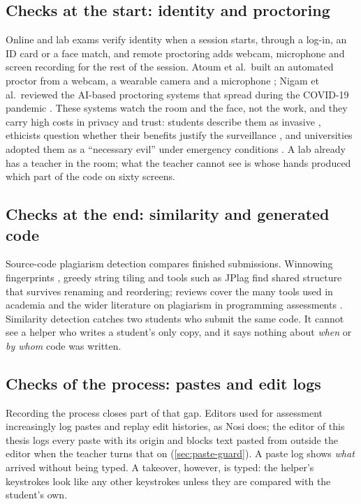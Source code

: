 \subsection{Checks at the start: identity and proctoring}
Online and lab exams verify identity when a session starts, through a
log-in, an ID card or a face match, and remote proctoring adds webcam,
microphone and screen recording for the rest of the session. Atoum et al.\
built an automated proctor from a webcam, a wearable camera and a microphone
\cite{atoum2017proctoring}; Nigam et al.\ reviewed the AI-based proctoring
systems that spread during the COVID-19 pandemic \cite{nigam2021proctoring}.
These systems watch the room and the face, not the work, and they carry high
costs in privacy and trust: students describe them as invasive
\cite{balash2021examining}, ethicists question whether their benefits justify
the surveillance \cite{coghlan2021proctor}, and universities adopted them as
a ``necessary evil'' under emergency conditions \cite{selwyn2023necessary}.
A lab already has a teacher in the room; what the teacher cannot see is whose
hands produced which part of the code on sixty screens.

\subsection{Checks at the end: similarity and generated code}
Source-code plagiarism detection compares finished submissions. Winnowing
fingerprints \cite{schleimer2003winnowing}, greedy string tiling
\cite{wise1993gst} and tools such as JPlag \cite{prechelt2002jplag} find
shared structure that survives renaming and reordering; reviews cover the
many tools used in academia \cite{novak2019similarity} and the wider
literature on plagiarism in programming assessments \cite{albluwi2019plagiarism}.
Similarity detection catches two students who submit the same code. It cannot
see a helper who writes a student's only copy, and it says nothing about
\emph{when} or \emph{by whom} code was written.

\subsection{Checks of the process: pastes and edit logs}
Recording the process closes part of that gap. Editors used for assessment
increasingly log pastes and replay edit histories, as Nosi does; the editor of
this thesis logs every paste with its origin and blocks text pasted from
outside the editor when the teacher turns that on (\cref{sec:paste-guard}). A
paste log shows \emph{what} arrived without being typed. A takeover, however,
is typed: the helper's keystrokes look like any other keystrokes unless they
are compared with the student's own.

